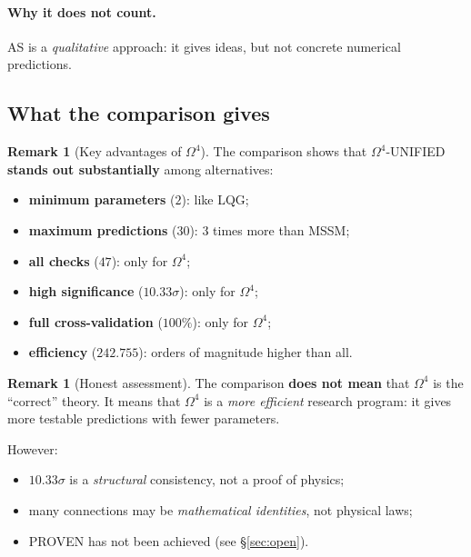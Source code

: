 \documentclass[11pt,a4paper]{article}
\newcommand{\Om}{\Omega^4}
\theoremstyle{definition}
\newtheorem{remark}[theorem]{Remark}
\begin{document}
\paragraph{Why it does not count.}
AS is a \emph{qualitative} approach: it gives ideas, 
but not concrete numerical predictions.

\subsection{What the comparison gives}
\label{subsec:benchmark-what-gives}

\begin{remark}[Key advantages of $\Om$]
\label{rem:benchmark-advantages}
The comparison shows that $\Om$-UNIFIED \textbf{stands out 
substantially} among alternatives:
\begin{itemize}
    \item \textbf{minimum parameters} ($2$): like LQG;
    \item \textbf{maximum predictions} ($30$): 3 times more than 
          MSSM;
    \item \textbf{all checks} ($47$): only for $\Om$;
    \item \textbf{high significance} ($10.33\sigma$): only 
          for $\Om$;
    \item \textbf{full cross-validation} ($100\%$): only 
          for $\Om$;
    \item \textbf{efficiency} ($242.755$): orders of magnitude higher than all.
\end{itemize}
\end{remark}

\begin{remark}[Honest assessment]
\label{rem:benchmark-honest}
The comparison \textbf{does not mean} that $\Om$ is the ``correct'' theory. 
It means that $\Om$ is a \emph{more efficient} 
research program: it gives more testable 
predictions with fewer parameters.

\medskip\noindent
However:
\begin{itemize}
    \item $10.33\sigma$ is a \emph{structural} consistency, 
          not a proof of physics;
    \item many connections may be \emph{mathematical 
          identities}, not physical laws;
    \item PROVEN has not been achieved (see §\ref{sec:open}).
\end{itemize}
\end{remark}
\end{document}

